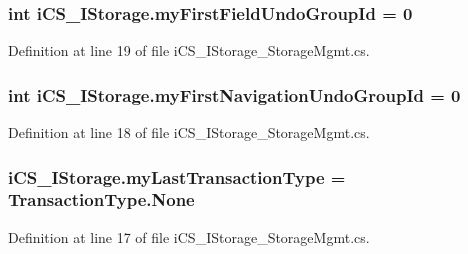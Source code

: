 \hypertarget{classi_c_s___i_storage_a152ea7b9651d04eb74d03508ccd0e4ec}{
\subsubsection[{my\+First\+Field\+Undo\+Group\+Id}]{\setlength{\rightskip}{0pt plus 5cm}int i\+C\+S\+\_\+\+I\+Storage.\+my\+First\+Field\+Undo\+Group\+Id = 0}}\label{classi_c_s___i_storage_a152ea7b9651d04eb74d03508ccd0e4ec}


Definition at line 19 of file i\+C\+S\+\_\+\+I\+Storage\+\_\+\+Storage\+Mgmt.\+cs.

\hypertarget{classi_c_s___i_storage_ae7540a290e62b50c91145b37749bb339}{
\subsubsection[{my\+First\+Navigation\+Undo\+Group\+Id}]{\setlength{\rightskip}{0pt plus 5cm}int i\+C\+S\+\_\+\+I\+Storage.\+my\+First\+Navigation\+Undo\+Group\+Id = 0}}\label{classi_c_s___i_storage_ae7540a290e62b50c91145b37749bb339}


Definition at line 18 of file i\+C\+S\+\_\+\+I\+Storage\+\_\+\+Storage\+Mgmt.\+cs.

\hypertarget{classi_c_s___i_storage_a3b225a376044a9c9f94bd2e96cbec862}{
\subsubsection[{my\+Last\+Transaction\+Type}]{ i\+C\+S\+\_\+\+I\+Storage.\+my\+Last\+Transaction\+Type = {\bf Transaction\+Type.\+None}}}\label{classi_c_s___i_storage_a3b225a376044a9c9f94bd2e96cbec862}


Definition at line 17 of file i\+C\+S\+\_\+\+I\+Storage\+\_\+\+Storage\+Mgmt.\+cs.

